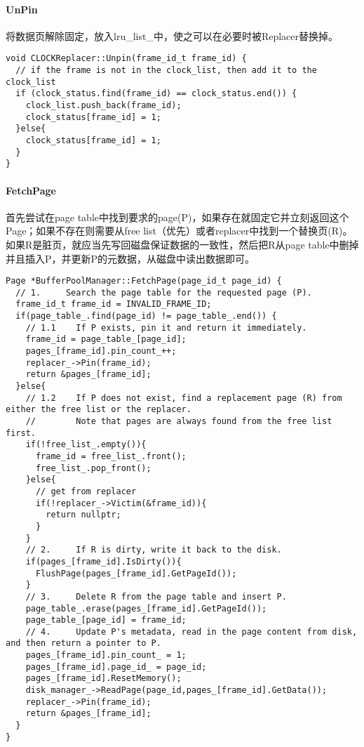 \documentclass[12pt,hyperref,a4paper,UTF8]{ctexart}
\begin{document}
\paragraph{UnPin}
将数据页解除固定，放入lru\_list\_中，使之可以在必要时被Replacer替换掉。
\begin{verbatim}
void CLOCKReplacer::Unpin(frame_id_t frame_id) {
  // if the frame is not in the clock_list, then add it to the clock_list
  if (clock_status.find(frame_id) == clock_status.end()) {
    clock_list.push_back(frame_id);
    clock_status[frame_id] = 1;
  }else{
    clock_status[frame_id] = 1;
  }
}
\end{verbatim}

\paragraph{FetchPage}
首先尝试在page table中找到要求的page(P)，如果存在就固定它并立刻返回这个Page；如果不存在则需要从free list（优先）或者replacer中找到一个替换页(R)。如果R是脏页，就应当先写回磁盘保证数据的一致性，然后把R从page table中删掉并且插入P，并更新P的元数据，从磁盘中读出数据即可。
\begin{verbatim}
Page *BufferPoolManager::FetchPage(page_id_t page_id) {
  // 1.     Search the page table for the requested page (P).
  frame_id_t frame_id = INVALID_FRAME_ID;
  if(page_table_.find(page_id) != page_table_.end()) {
    // 1.1    If P exists, pin it and return it immediately.
    frame_id = page_table_[page_id];
    pages_[frame_id].pin_count_++;
    replacer_->Pin(frame_id);
    return &pages_[frame_id];
  }else{
    // 1.2    If P does not exist, find a replacement page (R) from either the free list or the replacer.
    //        Note that pages are always found from the free list first.
    if(!free_list_.empty()){
      frame_id = free_list_.front();
      free_list_.pop_front();
    }else{
      // get from replacer
      if(!replacer_->Victim(&frame_id)){
        return nullptr;
      }
    }
    // 2.     If R is dirty, write it back to the disk.
    if(pages_[frame_id].IsDirty()){
      FlushPage(pages_[frame_id].GetPageId());
    }
    // 3.     Delete R from the page table and insert P.
    page_table_.erase(pages_[frame_id].GetPageId());
    page_table_[page_id] = frame_id;
    // 4.     Update P's metadata, read in the page content from disk, and then return a pointer to P.
    pages_[frame_id].pin_count_ = 1;
    pages_[frame_id].page_id_ = page_id;
    pages_[frame_id].ResetMemory();
    disk_manager_->ReadPage(page_id,pages_[frame_id].GetData());
    replacer_->Pin(frame_id);
    return &pages_[frame_id];
  }
}
\end{verbatim}
\end{document}
